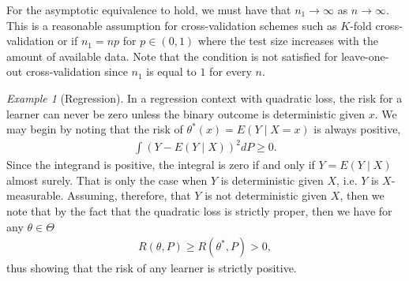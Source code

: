 \documentclass[11pt, a4paper]{article}
\theoremstyle{definition}
\theoremstyle{remark}
\newtheorem{example}{Example}
\newcommand{\q}{q}
\newcommand{\btheta}{\theta}
\begin{document}
For the asymptotic equivalence to hold, we must have that $ n_1 \to \infty $ as $ n \to \infty $. This is a reasonable assumption for cross-validation schemes such as $ K $-fold cross-validation or if $ n_1 = np $ for $ p \in (0,1) $ where the test size increases with the amount of available data. Note that the condition is not satisfied for leave-one-out cross-validation since $ n_1$ is equal to $ 1 $ for every $ n $.  
\begin{example}[Regression]
   In a regression context with quadratic loss, the risk for a learner can never be zero unless the binary outcome is deterministic given $ x $. We may begin by noting that the risk of $ \theta^*(x) = E(Y \mid X = x) $ is always positive,
   \begin{align*}
       \int (Y - E(Y \mid X))^2 d P \geq 0. 
   \end{align*}
   Since the integrand is positive, the integral is zero if and only if $ Y = E(Y \mid X) $ almost surely. That is only the case when $ Y $ is deterministic given $ X $, i.e. $ Y $ is $ X $-measurable. Assuming, therefore, that $ Y $ is not deterministic given $ X $, then we note that by the fact that the quadratic loss is strictly proper, then we have for any $ \theta \in \Theta $
   \begin{align*}
       R(\theta, P) \geq R(\theta^*, P) > 0,
   \end{align*}
    thus showing that the risk of any learner is strictly positive.
\end{example}



\end{document}
